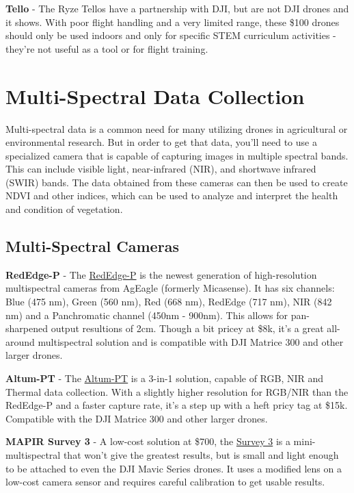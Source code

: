 \documentclass[
  12pt,
]{book}
\begin{document}
\textbf{Tello} - The Ryze Tellos have a partnership with DJI, but are not DJI drones and it shows. With poor flight handling and a very limited range, these \$100 drones should only be used indoors and only for specific STEM curriculum activities - they're not useful as a tool or for flight training.

\hypertarget{multi-spectral-data-collection}{%
\section{Multi-Spectral Data Collection}\label{multi-spectral-data-collection}}

Multi-spectral data is a common need for many utilizing drones in agricultural or environmental research. But in order to get that data, you'll need to use a specialized camera that is capable of capturing images in multiple spectral bands. This can include visible light, near-infrared (NIR), and shortwave infrared (SWIR) bands. The data obtained from these cameras can then be used to create NDVI and other indices, which can be used to analyze and interpret the health and condition of vegetation.

\hypertarget{multi-spectral-cameras}{%
\subsection{Multi-Spectral Cameras}\label{multi-spectral-cameras}}

\textbf{RedEdge-P} - The \href{https://ageagle.com/drone-sensors/rededge-p/}{RedEdge-P} is the newest generation of high-resolution multispectral cameras from AgEagle (formerly Micasense). It has six channels: Blue (475 nm), Green (560 nm), Red (668 nm), RedEdge (717 nm), NIR (842 nm) and a Panchromatic channel (450nm - 900nm). This allows for pan-sharpened output resultions of 2cm. Though a bit pricey at \$8k, it's a great all-around multispectral solution and is compatible with DJI Matrice 300 and other larger drones.

\textbf{Altum-PT} - The \href{https://ageagle.com/drone-sensors/altum-pt/}{Altum-PT} is a 3-in-1 solution, capable of RGB, NIR and Thermal data collection. With a slightly higher resolution for RGB/NIR than the RedEdge-P and a faster capture rate, it's a step up with a heft pricy tag at \$15k. Compatible with the DJI Matrice 300 and other larger drones.

\textbf{MAPIR Survey 3} - A low-cost solution at \$700, the \href{https://www.mapir.camera/pages/survey3-cameras}{Survey 3} is a mini-multispectral that won't give the greatest results, but is small and light enough to be attached to even the DJI Mavic Series drones. It uses a modified lens on a low-cost camera sensor and requires careful calibration to get usable results.
\end{document}
